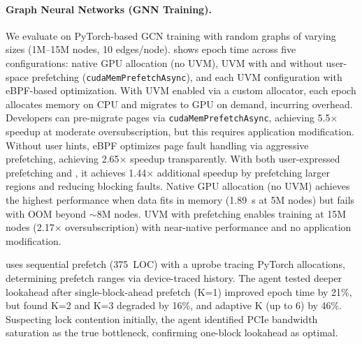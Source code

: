\paragraph{Graph Neural Networks (GNN Training).}
We evaluate \sys on PyTorch-based GCN training with random graphs of varying sizes (1M--15M nodes, 10 edges/node).
 shows epoch time across five configurations: native GPU allocation (no UVM), UVM with and without user-space prefetching (\texttt{cudaMemPrefetchAsync}), and each UVM configuration with \sys eBPF-based optimization.
With UVM enabled via a custom allocator, each epoch allocates memory on CPU and migrates to GPU on demand, incurring overhead.
Developers can pre-migrate pages via \texttt{cudaMemPrefetchAsync}, achieving 5.5$\times$ speedup at moderate oversubscription, but this requires application modification.
Without user hints, eBPF optimizes page fault handling via aggressive prefetching, achieving 2.65$\times$ speedup transparently.
With both user-expressed prefetching and \sys, it achieves 1.44$\times$ additional speedup by prefetching larger regions and reducing blocking faults.
Native GPU allocation (no UVM) achieves the highest performance when data fits in memory (1.89~s at 5M nodes) but fails with OOM beyond $\sim$8M nodes.
UVM with \sys prefetching enables training at 15M nodes (2.17$\times$ oversubscription) with near-native performance and no application modification.

\sys uses sequential prefetch (375~LOC) with a uprobe tracing PyTorch allocations, determining prefetch ranges via device-traced history.
The agent tested deeper lookahead after single-block-ahead prefetch (K=1) improved epoch time by 21\%, but found K=2 and K=3 degraded by 16\%, and adaptive K (up to 6) by 46\%.
Suspecting lock contention initially, the agent identified PCIe bandwidth saturation as the true bottleneck, confirming one-block lookahead as optimal.

